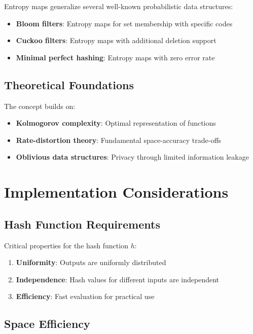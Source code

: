 \documentclass[11pt,final,hidelinks]{article}
\begin{document}
Entropy maps generalize several well-known probabilistic data structures:
\begin{itemize}
    \item \textbf{Bloom filters}: Entropy maps for set membership with specific codes
    \item \textbf{Cuckoo filters}: Entropy maps with additional deletion support
    \item \textbf{Minimal perfect hashing}: Entropy maps with zero error rate
\end{itemize}

\subsection{Theoretical Foundations}

The concept builds on:
\begin{itemize}
    \item \textbf{Kolmogorov complexity}: Optimal representation of functions
    \item \textbf{Rate-distortion theory}: Fundamental space-accuracy trade-offs
    \item \textbf{Oblivious data structures}: Privacy through limited information leakage
\end{itemize}

\section{Implementation Considerations}

\subsection{Hash Function Requirements}

Critical properties for the hash function $h$:
\begin{enumerate}
    \item \textbf{Uniformity}: Outputs are uniformly distributed
    \item \textbf{Independence}: Hash values for different inputs are independent
    \item \textbf{Efficiency}: Fast evaluation for practical use
\end{enumerate}

\subsection{Space Efficiency}
\end{document}
